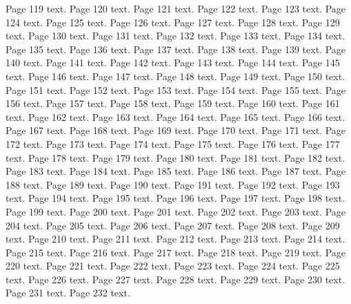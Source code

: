 \documentclass{article}
\begin{document}
Page 119 text.\newpage
Page 120 text.\newpage
Page 121 text.\newpage
Page 122 text.\newpage
Page 123 text.\newpage
Page 124 text.\newpage
Page 125 text.\newpage
Page 126 text.\newpage
Page 127 text.\newpage
Page 128 text.\newpage
Page 129 text.\newpage
Page 130 text.\newpage
Page 131 text.\newpage
Page 132 text.\newpage
Page 133 text.\newpage
Page 134 text.\newpage
Page 135 text.\newpage
Page 136 text.\newpage
Page 137 text.\newpage
Page 138 text.\newpage
Page 139 text.\newpage
Page 140 text.\newpage
Page 141 text.\newpage
Page 142 text.\newpage
Page 143 text.\newpage
Page 144 text.\newpage
Page 145 text.\newpage
Page 146 text.\newpage
Page 147 text.\newpage
Page 148 text.\newpage
Page 149 text.\newpage
Page 150 text.\newpage
Page 151 text.\newpage
Page 152 text.\newpage
Page 153 text.\newpage
Page 154 text.\newpage
Page 155 text.\newpage
Page 156 text.\newpage
Page 157 text.\newpage
Page 158 text.\newpage
Page 159 text.\newpage
Page 160 text.\newpage
Page 161 text.\newpage
Page 162 text.\newpage
Page 163 text.\newpage
Page 164 text.\newpage
Page 165 text.\newpage
Page 166 text.\newpage
Page 167 text.\newpage
Page 168 text.\newpage
Page 169 text.\newpage
Page 170 text.\newpage
Page 171 text.\newpage
Page 172 text.\newpage
Page 173 text.\newpage
Page 174 text.\newpage
Page 175 text.\newpage
Page 176 text.\newpage
Page 177 text.\newpage
Page 178 text.\newpage
Page 179 text.\newpage
Page 180 text.\newpage
Page 181 text.\newpage
Page 182 text.\newpage
Page 183 text.\newpage
Page 184 text.\newpage
Page 185 text.\newpage
Page 186 text.\newpage
Page 187 text.\newpage
Page 188 text.\newpage
Page 189 text.\newpage
Page 190 text.\newpage
Page 191 text.\newpage
Page 192 text.\newpage
Page 193 text.\newpage
Page 194 text.\newpage
Page 195 text.\newpage
Page 196 text.\newpage
Page 197 text.\newpage
Page 198 text.\newpage
Page 199 text.\newpage
Page 200 text.\newpage
Page 201 text.\newpage
Page 202 text.\newpage
Page 203 text.\newpage
Page 204 text.\newpage
Page 205 text.\newpage
Page 206 text.\newpage
Page 207 text.\newpage
Page 208 text.\newpage
Page 209 text.\newpage
Page 210 text.\newpage
Page 211 text.\newpage
Page 212 text.\newpage
Page 213 text.\newpage
Page 214 text.\newpage
Page 215 text.\newpage
Page 216 text.\newpage
Page 217 text.\newpage
Page 218 text.\newpage
Page 219 text.\newpage
Page 220 text.\newpage
Page 221 text.\newpage
Page 222 text.\newpage
Page 223 text.\newpage
Page 224 text.\newpage
Page 225 text.\newpage
Page 226 text.\newpage
Page 227 text.\newpage
Page 228 text.\newpage
Page 229 text.\newpage
Page 230 text.\newpage
Page 231 text.\newpage
Page 232 text.\newpage
\end{document}
